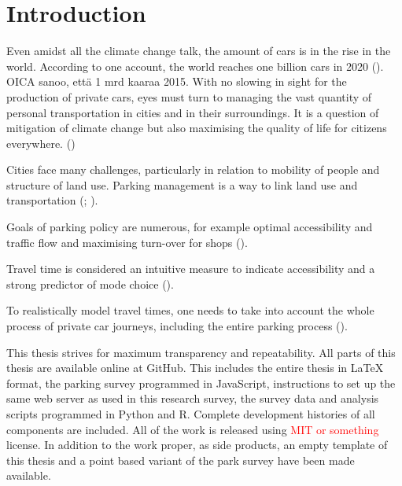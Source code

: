 \section{Introduction}
\justify


Even amidst all the climate change talk, the amount of cars is in the rise in the world. According to one account, the world reaches one billion cars in 2020 (\cite{Sperling2009}). OICA sanoo, että 1 mrd kaaraa 2015. With no slowing in sight for the production of private cars, eyes must turn to managing the vast quantity of personal transportation in cities and in their surroundings. It is a question of mitigation of climate change but also maximising the quality of life for citizens everywhere. (\cite{StatisticsFinland2019Energy2018})

Cities face many challenges, particularly in relation to mobility of people and structure of land use. Parking management is a way to link land use and transportation (\cite{Marsden2006TheReview}; \cite{Diallo2015MethodologyAnalysis}).

Goals of parking policy are numerous, for example optimal accessibility and traffic flow and maximising turn-over for shops (\cite{Marsden2006TheReview}). \par

Travel time is considered an intuitive measure to indicate accessibility and a strong predictor of mode choice (\cite{Frank2008UrbanChoice}).

To realistically model travel times, one needs to take into account the whole process of private car journeys, including the entire parking process (\cite{Salonen2013}).

This thesis strives for maximum transparency and repeatability. All parts of this thesis are available online at GitHub. This includes the entire thesis in LaTeX format, the parking survey programmed in JavaScript, instructions to set up the same web server as used in this research survey, the survey data and analysis scripts programmed in Python and R. Complete development histories of all components are included. All of the work is released using \textcolor{red}{MIT or something} license. In addition to the work proper, as side products, an empty template of this thesis and a point based variant of the park survey have been made available.

